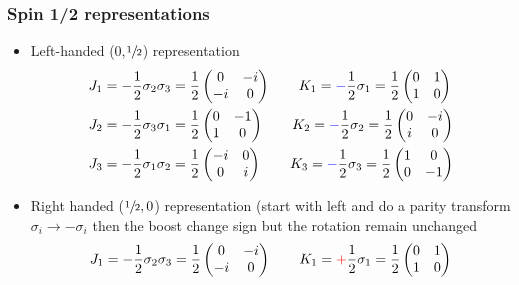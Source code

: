 \documentclass[../main.tex]{subfiles}
\begin{document}
\begin{itemize}
\subsubsection{Spin 1/2 representations}
\begin{itemize}
\item Left-handed (0,$\sfrac{1}{2}$) representation
\begin{align}
J_1&=-\frac{1}{2}\sigma_2\sigma_3=\frac{1}{2}\left(\begin{matrix}0&-i\\-i&0\end{matrix}\right)\qquad
K_1=\textcolor{blue}{-}\frac{1}{2}\sigma_1=\frac{1}{2}\left(\begin{matrix}0&1\\1&0\end{matrix}\right)\\
J_2&=-\frac{1}{2}\sigma_3\sigma_1=\frac{1}{2}\left(\begin{matrix}0&-1\\1&0\end{matrix}\right)\qquad
K_2=\textcolor{blue}{-}\frac{1}{2}\sigma_2=\frac{1}{2}\left(\begin{matrix}0&-i\\i&0\end{matrix}\right)\\
J_3&=-\frac{1}{2}\sigma_1\sigma_2=\frac{1}{2}\left(\begin{matrix}-i&0\\0&i\end{matrix}\right)\qquad
K_3=\textcolor{blue}{-}\frac{1}{2}\sigma_3=\frac{1}{2}\left(\begin{matrix}1&0\\0&-1\end{matrix}\right)
\end{align}
\item Right handed ($\sfrac{1}{2},0$) representation (start with left and do a parity transform $\sigma_i\rightarrow-\sigma_i$ then the boost change sign but the rotation remain unchanged
\begin{align}
J_1&=-\frac{1}{2}\sigma_2\sigma_3=\frac{1}{2}\left(\begin{matrix}0&-i\\-i&0\end{matrix}\right)\qquad
K_1=\textcolor{red}{+}\frac{1}{2}\sigma_1=\frac{1}{2}\left(\begin{matrix}0&1\\1&0\end{matrix}\right)\\

\end{align}
\end{itemize}
\end{itemize}
\end{document}
